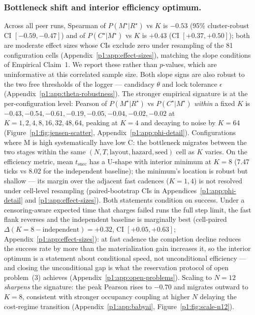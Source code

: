\documentclass{article}
\begin{document}
\subsubsection{Bottleneck shift and interior efficiency optimum.}
Across all peer runs, Spearman of $P(M^\star|R^\star)$ vs $K$ is $-0.53$ (95\% cluster-robust CI $[-0.59,-0.47]$) and of $P(C^\star|M^\star)$ vs $K$ is $+0.43$ (CI $[+0.37,+0.50]$); both are moderate effect sizes whose CIs exclude zero under resampling of the 81 configuration cells (Appendix~\ref{p1:app:effect-sizes}), matching the slope conditions of Empirical Claim~1. We report these rather than $p$-values, which are uninformative at this correlated sample size. Both slope signs are also robust to the two free thresholds of the logger --- candidacy $\theta$ and lock tolerance $\epsilon$ (Appendix~\ref{p1:app:theta-robustness}). The stronger empirical signature is at the per-configuration level: Pearson of $P(M^\star|R^\star)$ vs $P(C^\star|M^\star)$ \emph{within} a fixed $K$ is $-0.43, -0.54, -0.61, -0.19, -0.05, -0.04, -0.02, -0.02$ at $K{=}1,2,4,8,16,32,48,64$, peaking at $K{=}4$ and decaying to noise by $K{=}64$ (Figure~\ref{p1:fig:jensen-scatter}, Appendix~\ref{p1:app:phi-detail}). Configurations where M is high systematically have low C: the bottleneck migrates between the two stages within the same $(N,T,\text{layout},\text{hazard},\text{seed})$ cell as $K$ varies. On the efficiency metric, mean $t_{\mathrm{succ}}$ has a U-shape with interior minimum at $K{=}8$ (7.47 ticks vs 8.02 for the independent baseline); the minimum's location is robust but shallow --- its margin over the adjacent fast cadences ($K{=}1,4$) is not resolved under cell-level resampling (paired-bootstrap CIs in Appendices~\ref{p1:app:phi-detail} and \ref{p1:app:effect-sizes}). Both statements condition on success. Under a censoring-aware expected time that charges failed runs the full step limit, the fast flank reverses and the independent baseline is marginally best (cell-paired $\Delta(K{=}8-\text{independent}) = +0.32$, CI $[+0.05,+0.63]$; Appendix~\ref{p1:app:effect-sizes}): at fast cadence the completion decline reduces the success rate by more than the materialization gain increases it, so the interior optimum is a statement about conditional speed, not unconditional efficiency --- and closing the unconditional gap is what the reservation protocol of open problem~(3) achieves (Appendix~\ref{p1:app:open-problems}). Scaling to $N{=}12$ \emph{sharpens} the signature: the peak Pearson rises to $-0.70$ and
migrates outward to $K\!=\!8$, consistent with stronger occupancy
coupling at higher $N$ delaying the cost-regime transition
(Appendix~\ref{p1:app:babyai}, Figure~\ref{p1:fig:scale-n12}).
\end{document}
